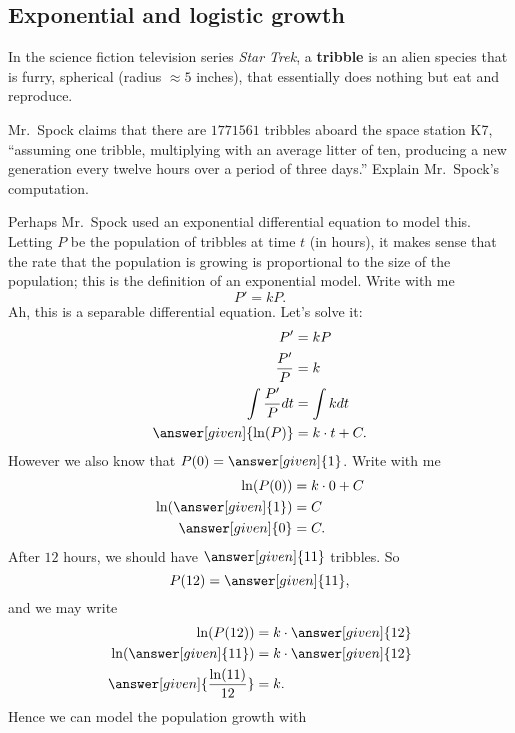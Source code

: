 \documentclass{ximera}
\begin{document}
\subsection{Exponential and logistic growth}

In the science fiction television series \textit{Star
  Trek}, a \textbf{tribble} is an alien species that is furry, spherical
(radius $\approx 5$ inches), that essentially does nothing but eat and
reproduce. 

\begin{example}
  Mr.\ Spock claims that there are $1771561$ tribbles aboard the space
  station K7, ``assuming one tribble, multiplying with an average
  litter of ten, producing a new generation every twelve hours over a
  period of three days.'' Explain Mr.\ Spock's computation.
  \begin{explanation}
    Perhaps Mr.\ Spock used an exponential differential equation to
    model this.  Letting $P$ be the population of tribbles at time $t$
    (in hours), it makes sense that the rate that the population is
    growing is proportional to the size of the population; this is the
    definition of an exponential model. Write with me
    \[
    P' = k P.
    \]
    Ah, this is a separable differential equation. Let's solve it:
    \begin{align*}
      P' &= k P\\
      \frac{P'}{P} &= k\\
      \int \frac{P'}{P} dt &= \int k dt\\
      \answer[given]{\ln(P)} &= k\cdot t + C.
    \end{align*}
    However we also know that $P(0) = \answer[given]{1}$. Write with me
    \begin{align*}
      \ln(P(0)) &= k\cdot 0 + C\\
      \ln(\answer[given]{1}) &= C\\
      \answer[given]{0} &=C.
    \end{align*}
    After $12$ hours, we should have $\answer[given]{11}$ tribbles. So 
    \[
    P(12) = \answer[given]{11},
    \]
    and we may write
    \begin{align*}
      \ln(P(12)) &= k\cdot \answer[given]{12}\\
    \ln(\answer[given]{11}) &= k\cdot \answer[given]{12}\\
    \answer[given]{\frac{\ln(11)}{12}} &= k.
    \end{align*}
    Hence we can model the population growth with

\end{explanation}
\end{example}
\end{document}
